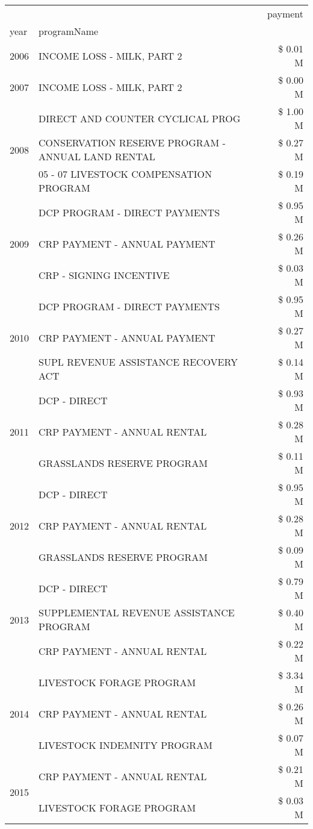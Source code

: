 \begin{tabular}{llr}
\toprule
 &  & payment \\
year & programName &  \\
\midrule
2006 & INCOME LOSS - MILK, PART 2 & \$ 0.01 M \\
\cline{1-3}
2007 & INCOME LOSS - MILK, PART 2 & \$ 0.00 M \\
\cline{1-3}
\multirow[t]{3}{*}{2008} & DIRECT AND COUNTER CYCLICAL PROG & \$ 1.00 M \\
 & CONSERVATION RESERVE PROGRAM - ANNUAL LAND RENTAL & \$ 0.27 M \\
 & 05 - 07 LIVESTOCK COMPENSATION PROGRAM & \$ 0.19 M \\
\cline{1-3}
\multirow[t]{3}{*}{2009} & DCP PROGRAM - DIRECT PAYMENTS & \$ 0.95 M \\
 & CRP PAYMENT - ANNUAL PAYMENT & \$ 0.26 M \\
 & CRP - SIGNING INCENTIVE & \$ 0.03 M \\
\cline{1-3}
\multirow[t]{3}{*}{2010} & DCP PROGRAM - DIRECT PAYMENTS & \$ 0.95 M \\
 & CRP PAYMENT - ANNUAL PAYMENT & \$ 0.27 M \\
 & SUPL REVENUE ASSISTANCE RECOVERY ACT & \$ 0.14 M \\
\cline{1-3}
\multirow[t]{3}{*}{2011} & DCP - DIRECT & \$ 0.93 M \\
 & CRP PAYMENT - ANNUAL RENTAL & \$ 0.28 M \\
 & GRASSLANDS RESERVE PROGRAM & \$ 0.11 M \\
\cline{1-3}
\multirow[t]{3}{*}{2012} & DCP - DIRECT & \$ 0.95 M \\
 & CRP PAYMENT - ANNUAL RENTAL & \$ 0.28 M \\
 & GRASSLANDS RESERVE PROGRAM & \$ 0.09 M \\
\cline{1-3}
\multirow[t]{3}{*}{2013} & DCP - DIRECT & \$ 0.79 M \\
 & SUPPLEMENTAL REVENUE ASSISTANCE PROGRAM & \$ 0.40 M \\
 & CRP PAYMENT - ANNUAL RENTAL & \$ 0.22 M \\
\cline{1-3}
\multirow[t]{3}{*}{2014} & LIVESTOCK FORAGE PROGRAM & \$ 3.34 M \\
 & CRP PAYMENT - ANNUAL RENTAL & \$ 0.26 M \\
 & LIVESTOCK INDEMNITY PROGRAM & \$ 0.07 M \\
\cline{1-3}
\multirow[t]{3}{*}{2015} & CRP PAYMENT - ANNUAL RENTAL & \$ 0.21 M \\
 & LIVESTOCK FORAGE PROGRAM & \$ 0.03 M \\

\end{tabular}
